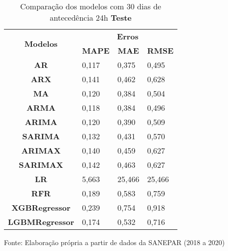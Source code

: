 \begin{table}[H]
	\centering
	\caption{Comparação dos modelos com 30 dias de antecedência 24h \textbf{Teste} }\label{tb:60-24tst}
	\begin{tabular}{@{}clll@{}}
		\toprule
		\multirow{2}{*}{\textbf{Modelos}} & \multicolumn{3}{c}{\textbf{Erros}}                                                                       \\ \cmidrule(l){2-4} 
		& \multicolumn{1}{c}{\textbf{MAPE}} & \multicolumn{1}{c}{\textbf{MAE}} & \multicolumn{1}{c}{\textbf{RMSE}} \\ \hline
\textbf{AR}                       & 0,117                             & 0,375                            & 0,495                             \\
\textbf{ARX}                      & 0,141                             & 0,462                            & 0,628                             \\
\textbf{MA}                       & 0,120                             & 0,384                            & 0,504                             \\
\textbf{ARMA}                     & 0,118                             & 0,384                            & 0,496                             \\
\textbf{ARIMA}                    & 0,120                             & 0,390                            & 0,509                             \\
\textbf{SARIMA}                   & 0,132                             & 0,431                            & 0,570                             \\
\textbf{ARIMAX}                   & 0,140                             & 0,459                            & 0,627                             \\
\textbf{SARIMAX}                  & 0,142                             & 0,463                            & 0,627                             \\
\textbf{LR}                       & 5,663                             & 25,466                           & 25,466                            \\
\textbf{RFR}                      & 0,189                             & 0,583                            & 0,759                             \\
\textbf{XGBRegressor}             & 0,239                             & 0,754                            & 0,918                             \\
\textbf{LGBMRegressor}            & 0,174                             & 0,532                            & 0,716                             \\ \bottomrule
	\end{tabular}

Fonte: Elaboração própria a partir de dados da SANEPAR (2018 a 2020)
\end{table}

